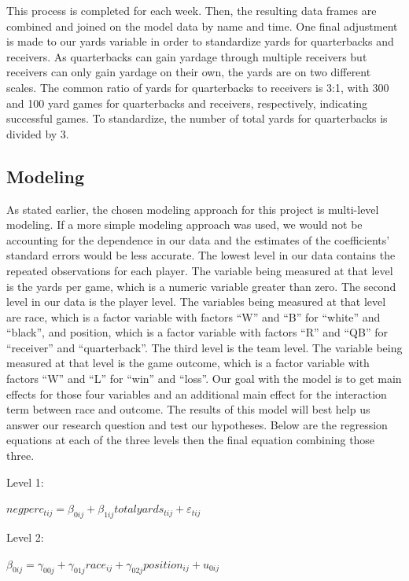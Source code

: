 \documentclass[12pt,twoside]{reedthesis}
\begin{document}
This process is completed for each week. Then, the resulting data frames
are combined and joined on the model data by name and time. One final
adjustment is made to our yards variable in order to standardize yards
for quarterbacks and receivers. As quarterbacks can gain yardage through
multiple receivers but receivers can only gain yardage on their own, the
yards are on two different scales. The common ratio of yards for
quarterbacks to receivers is 3:1, with 300 and 100 yard games for
quarterbacks and receivers, respectively, indicating successful games.
To standardize, the number of total yards for quarterbacks is divided by
3.

\subsection{Modeling}\label{modeling}

As stated earlier, the chosen modeling approach for this project is
multi-level modeling. If a more simple modeling approach was used, we
would not be accounting for the dependence in our data and the estimates
of the coefficients' standard errors would be less accurate. The lowest
level in our data contains the repeated observations for each player.
The variable being measured at that level is the yards per game, which
is a numeric variable greater than zero. The second level in our data is
the player level. The variables being measured at that level are race,
which is a factor variable with factors ``W'' and ``B'' for ``white''
and ``black'', and position, which is a factor variable with factors
``R'' and ``QB'' for ``receiver'' and ``quarterback''. The third level
is the team level. The variable being measured at that level is the game
outcome, which is a factor variable with factors ``W'' and ``L'' for
``win'' and ``loss''. Our goal with the model is to get main effects for
those four variables and an additional main effect for the interaction
term between race and outcome. The results of this model will best help
us answer our research question and test our hypotheses. Below are the
regression equations at each of the three levels then the final equation
combining those three.

Level 1: \(~\)

\(negperc_{tij} = \beta_{0ij} + \beta_{1ij}totalyards_{tij} + \varepsilon_{tij}\)

Level 2: \(~\)

\(\beta_{0ij} = \gamma_{00j} + \gamma_{01j}race_{ij} + \gamma_{02j}position_{ij} + u_{0ij}\)
\end{document}
